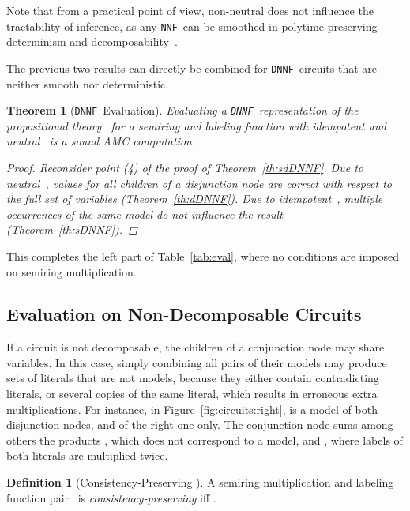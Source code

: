 \documentclass{article}
\theoremstyle{plain}
\newtheorem{theorem}{Theorem}
\theoremstyle{definition}
\newtheorem{definition}{Definition}
\newcommand{\NNF}{{\tt NNF}}
\newcommand{\DNNF}{{\tt DNNF}}
\begin{document}
Note that from a practical point of view, non-neutral
 does not influence the tractability of inference, as
any \NNF\ can be smoothed 
in polytime preserving determinism and decomposability~\citep{darwiche2002knowledge}.


The previous two results can directly be combined for \DNNF\ circuits
that are neither smooth nor deterministic.
\begin{theorem}[\DNNF\ Evaluation] \label{th:DNNF}
  Evaluating a \DNNF\ representation of the propositional theory~
  for a semiring and labeling function with idempotent and  neutral~
  is a sound AMC computation.
\begin{proof}
Reconsider point (4) of the proof of Theorem~\ref{th:sdDNNF}.
Due to neutral~, values for all children of a disjunction node are
correct with respect to the full set of variables
(Theorem~\ref{th:dDNNF}). Due to idempotent~, multiple occurrences  of the same model
do not influence the result (Theorem~\ref{th:sDNNF}). 
  \end{proof}
\end{theorem}

This completes the left part of Table~\ref{tab:eval}, where no
conditions are imposed on semiring multiplication.

\subsection{Evaluation on Non-Decomposable Circuits}\label{sec:nondecomposable}
If a circuit is not
decomposable, the children of a conjunction node may share
variables. In this case, 
simply combining all pairs of their models may
produce sets of literals that are not models, because they either contain
contradicting literals, or several copies of the
same literal, which results in erroneous extra multiplications. For
instance, in Figure~\ref{fig:circuits:right},  is a model of both disjunction nodes, and  of the
right one only. The conjunction node sums among others the products
,
which does not correspond to a model, and 
,
where labels of both literals are multiplied twice.
\begin{definition}[Consistency-Preserving ]\label{def:cp}
  A semiring multiplication and labeling function pair~ is 
  \emph{consistency-preserving} iff . 
\end{definition}
\end{document}
